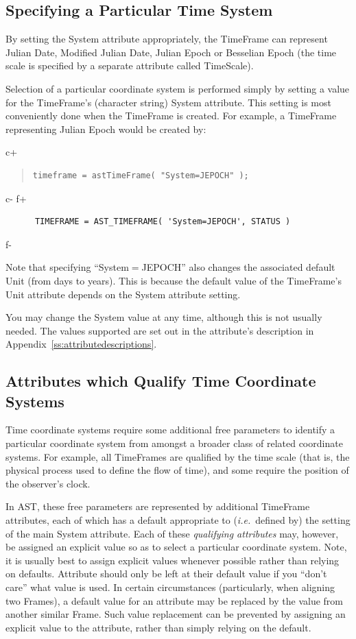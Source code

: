 \documentclass[twoside,11pt]{article}
\newcommand{\appref}[1]{Appendix~\ref{#1}}
\newcommand{\appref}[1]{\ref{#1}}
\begin{document}
\subsection{Specifying a Particular Time System}
By setting the System attribute appropriately, the TimeFrame can represent
Julian Date, Modified Julian Date, Julian Epoch or Besselian Epoch (the
time scale is specified by a separate attribute called TimeScale).

Selection of a particular coordinate system is performed simply by
setting a value for the TimeFrame's (character string) System
attribute. This setting is most conveniently done when the TimeFrame is
created. For example, a TimeFrame representing Julian Epoch would be created
by:

c+
\begin{quote}
\small
\begin{verbatim}
timeframe = astTimeFrame( "System=JEPOCH" );
\end{verbatim}
\normalsize
\end{quote}
c-
f+
\small
\begin{verbatim}
      TIMEFRAME = AST_TIMEFRAME( 'System=JEPOCH', STATUS )
\end{verbatim}
\normalsize
f-

Note that specifying ``System$=$JEPOCH'' also changes the associated
default Unit (from days to years). This is because the default value
of the TimeFrame's Unit attribute depends on the System attribute setting.

You may change the System value at any time, although this is not
usually needed.  The values supported are set out in the attribute's
description in \appref{ss:attributedescriptions}.

\subsection{Attributes which Qualify Time Coordinate Systems}

Time coordinate systems require some additional free parameters to identify
a particular coordinate system from amongst a broader class of related
coordinate systems. For example, all TimeFrames are qualified by the time
scale (that is, the physical process used to define the flow of time),
and some require the position of the observer's clock.

In AST, these free parameters are represented by additional TimeFrame
attributes, each of which has a default appropriate to ({\em{i.e.}}\ defined
by) the setting of the main System attribute. Each of these {\em{qualifying
attributes}} may, however, be assigned an explicit value so as to select a
particular coordinate system. Note, it is usually best to assign explicit
values whenever possible rather than relying on defaults. Attribute
should only be left at their default value if you ``don't care'' what
value is used. In certain circumstances (particularly, when aligning two
Frames), a default value for an attribute may be replaced by the value
from another similar Frame. Such value replacement can be prevented by
assigning an explicit value to the attribute, rather than simply relying on
the default.
\end{document}
